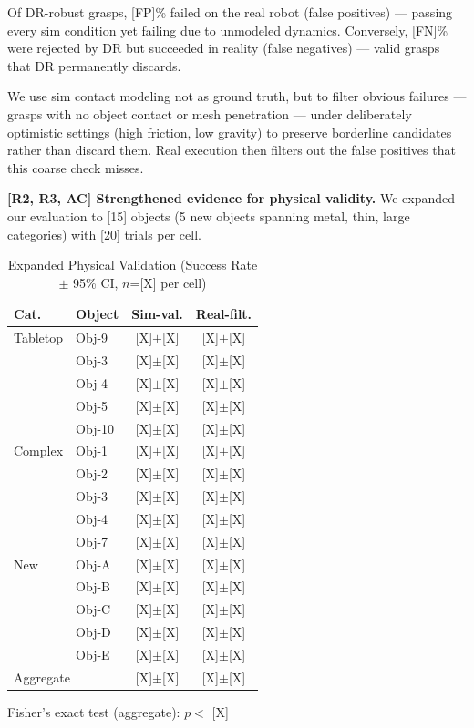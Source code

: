 \documentclass[conference]{IEEEtran}
\newcommand{\rtwo}{{\color{R2}R2}}
\newcommand{\rthree}{{\color{R3}R3}}
\newcommand{\acmark}{{\color{AC}AC}}
\newcommand{\rssparagraph}[1]{{\bf #1.}}
\begin{document}
Of DR-robust grasps, [FP]\% failed on the real robot (false positives) --- passing every sim condition yet failing due to unmodeled dynamics. Conversely, [FN]\% were rejected by DR but succeeded in reality (false negatives) --- valid grasps that DR permanently discards.

\noindent[\rthree, \acmark] We use sim contact modeling not as ground truth, but to filter obvious failures --- grasps with no object contact or mesh penetration --- under deliberately optimistic settings (high friction, low gravity) to preserve borderline candidates rather than discard them. Real execution then filters out the false positives that this coarse check misses.

\rssparagraph{[\rtwo, \rthree, \acmark] Strengthened evidence for physical validity}
We expanded our evaluation to [15] objects (5 new objects spanning metal, thin, large categories) with [20] trials per cell.

\begin{table}[h]
\centering
\small
\caption{Expanded Physical Validation (Success Rate $\pm$ 95\% CI, $n$=[X] per cell)}
\label{tab:expanded_validation}
\begin{tabular}{ll|cc}
\toprule
\textbf{Cat.} & \textbf{Object} & \textbf{Sim-val.} & \textbf{Real-filt.} \\ \midrule
Tabletop & Obj-9  & {[X]}$\pm${[X]} & {[X]}$\pm${[X]} \\
         & Obj-3  & {[X]}$\pm${[X]} & {[X]}$\pm${[X]} \\
         & Obj-4  & {[X]}$\pm${[X]} & {[X]}$\pm${[X]} \\
         & Obj-5  & {[X]}$\pm${[X]} & {[X]}$\pm${[X]} \\
         & Obj-10 & {[X]}$\pm${[X]} & {[X]}$\pm${[X]} \\
\midrule
Complex  & Obj-1  & {[X]}$\pm${[X]} & {[X]}$\pm${[X]} \\
         & Obj-2  & {[X]}$\pm${[X]} & {[X]}$\pm${[X]} \\
         & Obj-3  & {[X]}$\pm${[X]} & {[X]}$\pm${[X]} \\
         & Obj-4  & {[X]}$\pm${[X]} & {[X]}$\pm${[X]} \\
         & Obj-7  & {[X]}$\pm${[X]} & {[X]}$\pm${[X]} \\
\midrule
New      & Obj-A  & {[X]}$\pm${[X]} & {[X]}$\pm${[X]} \\
         & Obj-B  & {[X]}$\pm${[X]} & {[X]}$\pm${[X]} \\
         & Obj-C  & {[X]}$\pm${[X]} & {[X]}$\pm${[X]} \\
         & Obj-D  & {[X]}$\pm${[X]} & {[X]}$\pm${[X]} \\
         & Obj-E  & {[X]}$\pm${[X]} & {[X]}$\pm${[X]} \\
\midrule
\multicolumn{2}{l|}{Aggregate} & {[X]}$\pm${[X]} & {[X]}$\pm${[X]} \\
\bottomrule
\end{tabular}

{\small Fisher's exact test (aggregate): $p < $ {[X]}}
\end{table}
\end{document}
